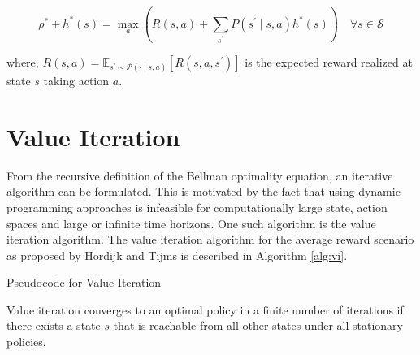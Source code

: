 \begin{equation}
    \rho^* + h^*(s) = \max_a \left( R(s, a) + \sum_{s^\prime} P(s^\prime \mid s, a) h^*(s) \right) \quad \forall s \in \mathcal{S}
\end{equation}

where, $R(s,a) = \mathbb{E}_{s^\prime \sim \mathcal{P}(\cdot \mid s, a)}\left[ R(s, a, s^\prime) \right]$ is the expected reward realized at state $s$ taking action $a$.

\section{Value Iteration}

From the recursive definition of the Bellman optimality equation, an iterative algorithm can be formulated. 
This is motivated by the fact that using dynamic programming approaches is infeasible for computationally large state, action spaces and large or infinite time horizons.
One such algorithm is the value iteration algorithm. The value iteration algorithm for the average reward scenario as proposed by Hordijk and Tijms \cite{hordijk_modified_1975} is described in Algorithm \ref{alg:vi}.

\begin{algorithm}[!htbp]
    
    
    \BlankLine
    \BlankLine
    \caption{Pseudocode for Value Iteration}\label{alg:vi}
\end{algorithm}

Value iteration converges to an optimal policy in a finite number of iterations \cite{puterman_chapter_1990} if there exists a state $s$ that is reachable from all other states under all stationary policies.


